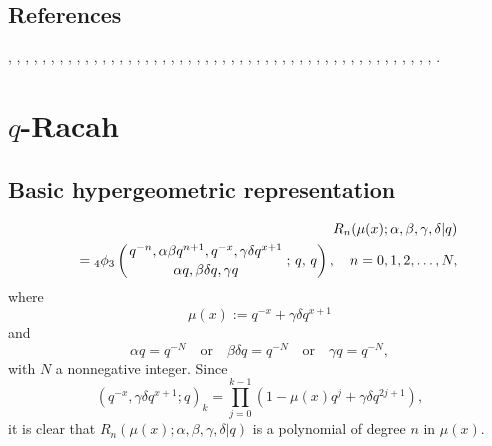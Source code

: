 \documentclass[envcountchap,graybox]{svmono}
\newcommand{\qhyp}[5]{\mbox{}_{#1}{\phi}_{#2}
\left(\genfrac{}{}{0pt}{}{#3}{#4}\,;\,q,\,#5\right)}
\begin{document}
\subsection*{References}
\cite{Abreu}, \cite{AlSalam90}, \cite{AndrewsAskey85}, \cite{Askey89I},
\cite{AskeyWilson85}, \cite{AskeyRahmanSuslov}, \cite{Atak97}, \cite{AtakRahmanSuslov},
\cite{AtakSuslov88}, \cite{AtakSuslov92}, \cite{Bang}, \cite{BrownEvansIsmail},
\cite{BrownIsmail}, \cite{GasperRahman86}, \cite{GasperRahman90}, \cite{GrunbaumHaine96},
\cite{GrunbaumHaine97}, \cite{Ismail86I}, \cite{Ismail2003}, \cite{IsmailLetMasVal},
\cite{IsmailLetValWimp91}, \cite{IsmailMasson95}, \cite{IsmailMassonRahman},
\cite{IsmailRahman91}, \cite{IsmailStanton88}, \cite{IsmailWilson}, \cite{KalninsMiller89},
\cite{Koelink94}, \cite{Koelink96I}, \cite{Koorn92}, \cite{Koorn93}, \cite{Koorn2007},
\cite{Leonard}, \cite{Miller89}, \cite{MimachiI}, \cite{NassrallahRahman}, \cite{Nikiforov+},
\cite{NoumiMimachi90I}, \cite{NoumiMimachi92}, \cite{Rahman82}, \cite{Rahman85},
\cite{Rahman86II}, \cite{Rahman88}, \cite{Rahman92}, \cite{Rahman96}, \cite{RahmanSuslov},
\cite{RahmanVerma91}, \cite{Spiridonov97}, \cite{Szwarc}, \cite{Vinet}, \cite{Wilson91}.

\newpage

\section{$q$-Racah}
\par\setcounter{equation}{0}

\subsection*{Basic hypergeometric representation}
\begin{eqnarray}
\label{DefqRacah}
& &R_n(\mu(x);\alpha,\beta,\gamma,\delta|q)\nonumber\\
& &{}=\qhyp{4}{3}{q^{-n},\alpha\beta q^{n+1},q^{-x},\gamma\delta q^{x+1}}{\alpha q,\beta\delta q,\gamma q}{q},
\quad n=0,1,2,\ldots,N,
\end{eqnarray}
where
$$\mu(x):=q^{-x}+\gamma\delta q^{x+1}$$
and
$$\alpha q=q^{-N}\quad\textrm{or}\quad\beta\delta q=q^{-N}\quad\textrm{or}\quad\gamma q=q^{-N},$$
with $N$ a nonnegative integer.
Since
$$(q^{-x},\gamma\delta q^{x+1};q)_k=\prod_{j=0}^{k-1}\left(1-\mu(x)q^j+\gamma\delta q^{2j+1}\right),$$
it is clear that $R_n(\mu(x);\alpha,\beta,\gamma,\delta|q)$ is a polynomial of degree $n$ in $\mu(x)$.
\end{document}
